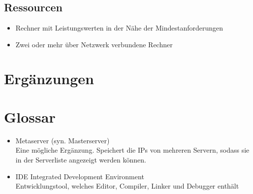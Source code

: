\documentclass[a4paper,10pt]{article}
\begin{document}
\subsection{Ressourcen}
\begin{itemize}
\item Rechner mit Leistungswerten in der Nähe der Mindestanforderungen
\item Zwei oder mehr über Netzwerk verbundene Rechner
\end{itemize}
\section{Ergänzungen}
\section{Glossar}
\begin{itemize}
\item Metaserver (syn. Masterserver) \\
Eine mögliche Ergänzung. Speichert die IPs von mehreren Servern, sodass sie in der Serverliste angezeigt werden können.
\item IDE Integrated Development Environment \\
Entwicklungstool, welches Editor, Compiler, Linker und Debugger enthält
\end{itemize}
\end{document}
